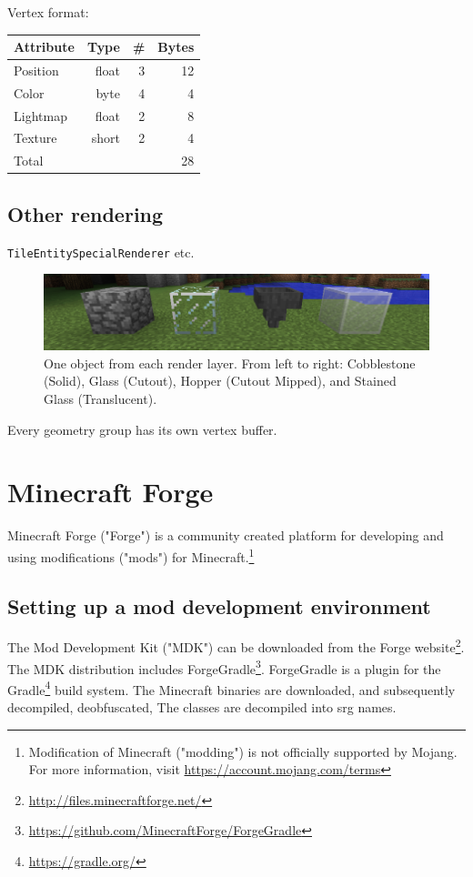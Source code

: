 \documentclass[]{article}
\begin{document}
Vertex format:

\begin{tabular}{|l|r|r|r|} \hline
  Attribute & Type & \# & Bytes\\ \hline
  Position & float & 3 & 12 \\ \hline
  Color & byte & 4 & 4 \\ \hline
  Lightmap & float & 2 & 8 \\ \hline
  Texture & short & 2 & 4 \\ \hline
  Total &   &  & 28 \\ \hline
\end{tabular}

\subsection{Other rendering}
\texttt{TileEntitySpecialRenderer} etc.

\begin{figure}
  \includegraphics[width=\textwidth]{ss-layers.png}
  \centering
  \caption{One object from each render layer. From left to right: Cobblestone (Solid), Glass (Cutout), Hopper (Cutout Mipped), and Stained Glass (Translucent).}
  \label{fig:ss-layers}
\end{figure}
Every geometry group has its own vertex buffer.

\section{Minecraft Forge}
Minecraft Forge ("Forge") is a community created platform for developing and using modifications ("mods") for Minecraft.\footnote{Modification of Minecraft ("modding") is not officially supported by Mojang. For more information, visit \url{https://account.mojang.com/terms}}
\subsection{Setting up a mod development environment}
The Mod Development Kit ("MDK") can be downloaded from the Forge website\footnote{\url{http://files.minecraftforge.net/}}.
The MDK distribution includes ForgeGradle\footnote{\url{https://github.com/MinecraftForge/ForgeGradle}}.
ForgeGradle is a plugin for the Gradle\footnote{\url{https://gradle.org/}} build system.
The Minecraft binaries are downloaded, and subsequently decompiled, deobfuscated, 
The classes are decompiled into srg names.
\end{document}
